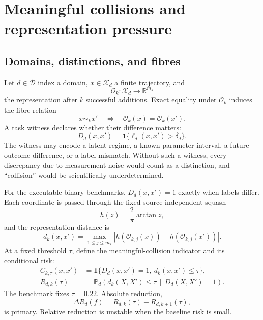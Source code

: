\documentclass[10pt]{article}
\theoremstyle{definition}
\theoremstyle{remark}
\newcommand{\R}{\mathbb R}
\newcommand{\Prob}{\mathbb P}
\newcommand{\cX}{\mathcal X}
\newcommand{\cD}{\mathcal D}
\newcommand{\Obs}{\mathcal O}
\newcommand{\ind}{\mathbf 1}
\newcommand{\given}{\,\middle|\,}
\begin{document}
\section{Meaningful collisions and representation pressure}
\label{sec:formal}

\subsection{Domains, distinctions, and fibres}

Let $d\in\cD$ index a domain, $x\in\cX_d$ a finite trajectory, and
\begin{equation}
  \Obs_k:\cX_d\longrightarrow\R^{m_k}
  \label{eq:observation-map}
\end{equation}
the representation after $k$ successful additions. Exact equality under $\Obs_k$ induces the fibre relation
\begin{equation}
  x\sim_k x' \quad\Longleftrightarrow\quad \Obs_k(x)=\Obs_k(x').
\end{equation}
A task witness declares whether their difference matters:
\begin{equation}
  D_d(x,x')
  =\ind\{\ell_d(x,x')>\delta_d\}.
  \label{eq:distinction}
\end{equation}
The witness may encode a latent regime, a known parameter interval, a future-outcome difference, or a label mismatch. Without such a witness, every discrepancy due to measurement noise would count as a distinction, and ``collision'' would be scientifically underdetermined.

For the executable binary benchmarks, $D_d(x,x')=1$ exactly when labels differ. Each coordinate is passed through the fixed source-independent squash
\begin{equation}
  h(z)=\frac{2}{\pi}\arctan z,
\end{equation}
and the representation distance is
\begin{equation}
  d_k(x,x')
  =\max_{1\le j\le m_k}
  \left|h(\Obs_{k,j}(x))-h(\Obs_{k,j}(x'))\right|.
  \label{eq:max-metric}
\end{equation}
At a fixed threshold $\tau$, define the meaningful-collision indicator and its conditional risk:
\begin{align}
  C_{k,\tau}(x,x')
  &=\ind\{D_d(x,x')=1,\ d_k(x,x')\le\tau\},
  \label{eq:collision}\\
  R_{d,k}(\tau)
  &=\Prob_d\!\left(d_k(X,X')\le\tau\given D_d(X,X')=1\right).
  \label{eq:risk}
\end{align}
The benchmark fixes $\tau=0.22$. Absolute reduction,
\begin{equation}
  \Delta R_d(f)=R_{d,k}(\tau)-R_{d,k+1}(\tau),
  \label{eq:absolute-reduction}
\end{equation}
is primary. Relative reduction is unstable when the baseline risk is small.
\end{document}
